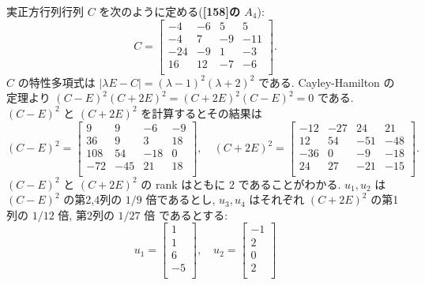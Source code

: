 \documentclass[12pt,twoside]{jarticle}
\begin{document}
\begin{example}
  実正方行列行列 $C$ を次のように定める({\bf[158]の $A_4$}):
  \begin{equation*}
    C =
    \begin{bmatrix}
       -4 &  -6 &   5 &   5 \\
       -4 &   7 &  -9 & -11 \\
      -24 &  -9 &   1 &  -3 \\
       16 &  12 &  -7 &  -6 \\
    \end{bmatrix}.
  \end{equation*}
  $C$ の特性多項式は $|\lambda E - C| = (\lambda-1)^2(\lambda+2)^2$ である.
  Cayley-Hamilton の定理より $(C-E)^2(C+2E)^2=(C+2E)^2(C-E)^2=0$ である.
  $(C-E)^2$ と $(C+2E)^2$ を計算するとその結果は
  \begin{equation*}
    (C-E)^2=
    \begin{bmatrix}
        9 &   9 &  -6 & -9 \\
       36 &   9 &   3 & 18 \\
      108 &  54 & -18 &  0 \\
      -72 & -45 &  21 & 18 \\
    \end{bmatrix},
    \quad
    (C+2E)^2 =
    \begin{bmatrix}
      -12 & -27 &  24 &  21 \\
       12 &  54 & -51 & -48 \\
      -36 &   0 &  -9 & -18 \\
       24 &  27 & -21 & -15 \\
    \end{bmatrix}.
  \end{equation*}
  $(C-E)^2$ と $(C+2E)^2$ の rank はともに $2$ であることがわかる.
  $u_1,u_2$ は $(C-E)^2$ の第2,4列の $1/9$ 倍であるとし,
  $u_3,u_4$ はそれぞれ $(C+2E)^2$ の第1列の $1/12$ 倍, 第2列の $1/27$ 倍
  であるとする:
  \begin{equation*}
    u_1 =
    \begin{bmatrix}
      1 \\ 1 \\ 6 \\ -5 \\
    \end{bmatrix},
    \quad
    u_2 =
    \begin{bmatrix}
      -1 \\ 2 \\ 0 \\ 2 \\

\end{bmatrix}
\end{equation*}
\end{example}
\end{document}
